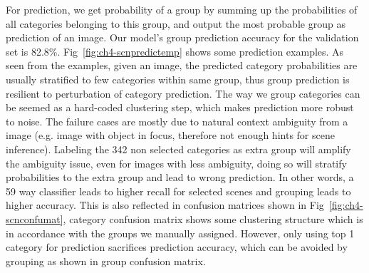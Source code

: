 For prediction, we get probability of a group by summing up the probabilities of all categories belonging to this group, and output the most probable group as prediction of an image. Our model's group prediction accuracy for the validation set is 82.8\%. Fig~\ref{fig:ch4-scnpredictemp} shows some prediction examples. As seen from the examples, given an image, the predicted category probabilities are usually stratified to few categories within same group, thus group prediction is resilient to perturbation of category prediction. The way we group categories can be seemed as a hard-coded clustering step, which makes prediction more robust to noise. The failure cases are mostly due to natural context ambiguity from a image (e.g. image with object in focus, therefore not enough hints for scene inference). Labeling the 342 non selected categories as extra group will amplify the ambiguity issue, even for images with less ambiguity, doing so will stratify probabilities to the extra group and lead to wrong prediction. In other words, a 59 way classifier leads to higher recall for selected scenes and grouping leads to higher accuracy. This is also reflected in confusion matrices shown in Fig~\ref{fig:ch4-scnconfumat}, category confusion matrix shows some clustering structure which is in accordance with the groups we manually assigned. However, only using top 1 category for prediction sacrifices prediction accuracy, which can be avoided by grouping as shown in group confusion matrix.

